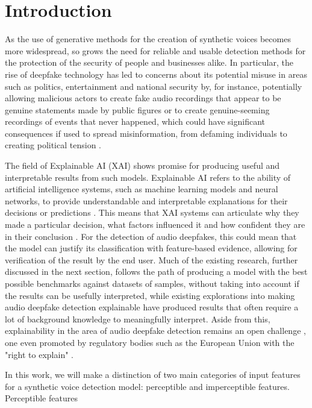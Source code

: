 \documentclass{article}
\begin{document}
    \section{Introduction}
    As the use of generative methods for the creation of synthetic voices becomes more widespread,
    so grows the need for reliable and usable detection methods for the protection of the security
    of people and businesses alike. In particular, the rise of deepfake technology has led to
	concerns about its potential misuse in areas such as politics, entertainment and national
	security by, for instance, potentially allowing malicious actors to create fake audio
	recordings that appear to be genuine statements made by public figures or to create
	genuine-seeming recordings of events that never happened, which could have significant
	consequences if used to spread misinformation, from defaming individuals to creating political
	tension \cite{veerasamy_rising_2022,albahar_deepfakes_2005}.
	\par
	The field of Explainable AI (XAI) shows promise for producing useful and interpretable results
	from such models. Explainable AI refers to the ability of artificial intelligence systems,
	such as machine learning models and neural networks, to provide understandable and
	interpretable explanations for their decisions or predictions \cite{hind_explaining_2019}.
	This means that XAI systems can articulate why they made a particular decision, what factors
	influenced it and how confident they are in their conclusion \cite{hind_explaining_2019}. For
	the detection of audio deepfakes, this could mean that the model can justify its
	classification with feature-based evidence, allowing for verification of the result by the end
	user. Much of the existing research, further discussed in the next section, follows the path
	of producing a model with the best possible benchmarks against datasets of samples, without
	taking into account if the results can be usefully interpreted, while existing explorations
	into making audio deepfake detection explainable have produced results that often require a
	lot of background knowledge to meaningfully interpret. Aside from this, explainability in the
	area of audio deepfake detection remains an open challenge \cite{cuccovillo_open_2022}, one
	even promoted by regulatory bodies such as the European Union with the "right to explain"
	\cite{goodman_european_2017}.
	\par
	In this work, we will make a distinction of two main categories of input features for a
	synthetic voice detection model: perceptible and imperceptible features. Perceptible features
\end{document}
